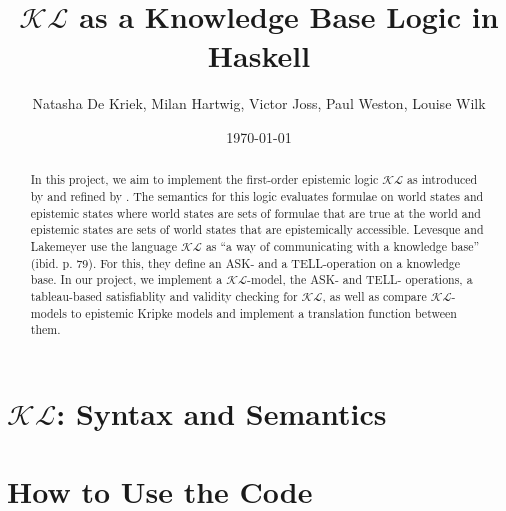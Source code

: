 \documentclass[12pt,a4paper]{article}
\title{$\mathcal{KL}$ as a Knowledge Base Logic in Haskell}
\author{Natasha De Kriek, Milan Hartwig, Victor Joss, Paul Weston, Louise Wilk}
\date{\today}
\begin{document}
\maketitle

\begin{abstract}
In this project, we aim to implement the first-order epistemic logic $\mathcal{KL}$ as introduced by \textcite{levesque1981} and refined by \textcite{Lokb}. 
The semantics for this logic evaluates formulae on world states and epistemic states where world states are sets of formulae that are true at the world and epistemic states are sets of world states that are epistemically accessible. Levesque and Lakemeyer use the language $\mathcal{KL}$ as “a way of communicating with a knowledge base” (ibid. p. 79). For this, they define an ASK- and a TELL-operation on a knowledge base. In our project, we implement a  $\mathcal{KL}$-model, the ASK- and TELL- operations, a tableau-based satisfiablity and validity checking for  $\mathcal{KL}$, as well as compare  $\mathcal{KL}$-models to epistemic Kripke models and implement a translation function between them.
\end{abstract}


\tableofcontents

\clearpage


%


\section{\texorpdfstring{$\mathcal{KL}$}{KL}: Syntax and Semantics}\label{sec:KLmodel}

















% 

\section{How to Use the Code}
\end{document}
